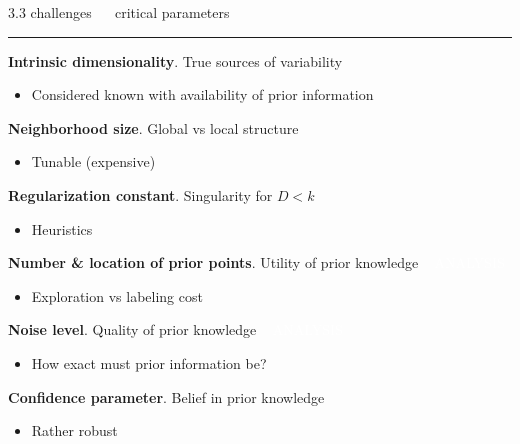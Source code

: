 \documentclass[11pt, compress, t, notes = noshow, xcolor = table, 
aspectratio = 1610]{beamer}
\newcommand{\maketag}[1]{\colorbox{highlightcol}{\textcolor{white}
{\MakeUppercase{#1}}}}
\newcommand{\highlight}[1]{\textcolor{highlightcol}{\textbf{#1}}}
\newcommand{\arritem}{\item[\highlight{$\rightarrow$}]}
\begin{document}

\LARGE
\begin{frame}{\textcolor{gray!90}{3.3 challenges} ~~ critical parameters}
\normalsize
\vspace{-0.5cm}
\noindent \textcolor{gray!90}{\rule{\textwidth}{1pt}}
\smallskip

\textbf{Intrinsic dimensionality}. True sources of variability

\begin{itemize}
  \arritem Considered known with availability of prior information
\end{itemize}


\textbf{Neighborhood size}. Global vs local structure

\begin{itemize}
  \arritem Tunable (expensive)
\end{itemize}


\textbf{Regularization constant}. Singularity for $D < k$

\begin{itemize}
  \arritem Heuristics
\end{itemize}


\textbf{Number \& location of prior points}. Utility of prior knowledge ~ 
\maketag{analysis}

\begin{itemize}
  \arritem Exploration vs labeling cost
\end{itemize}

\textbf{Noise level}. Quality of prior knowledge ~ 
\maketag{analysis}

\begin{itemize}
  \arritem How exact must prior information be?
\end{itemize}

\textbf{Confidence parameter}. Belief in prior knowledge

\begin{itemize}
  \arritem Rather robust
\end{itemize}

\end{frame}

\end{document}
